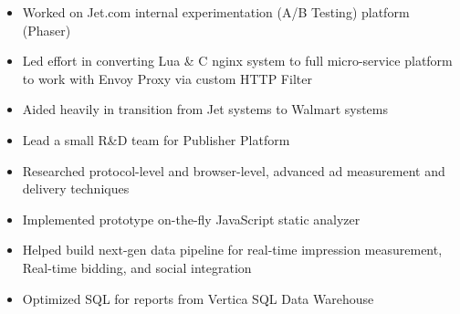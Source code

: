 \documentclass[10pt,a4paper,ragged2e]{altacv}
\begin{document}
\divider

\begin{itemize}
\item Worked on Jet.com internal experimentation (A/B Testing) platform (Phaser)
\item Led effort in converting Lua \& C nginx system to full micro-service platform to work with Envoy Proxy via custom HTTP Filter
\item Aided heavily in transition from Jet systems to Walmart systems
\end{itemize}

\divider

\begin{itemize}
\item Lead a small R\&D team for Publisher Platform
\item Researched protocol-level and browser-level, advanced ad measurement and delivery techniques
\item Implemented prototype on-the-fly JavaScript static analyzer
\item Helped build next-gen data pipeline for real-time impression measurement, Real-time bidding, and social integration
\item Optimized SQL for reports from Vertica SQL Data Warehouse
\end{itemize}




%
\end{document}
